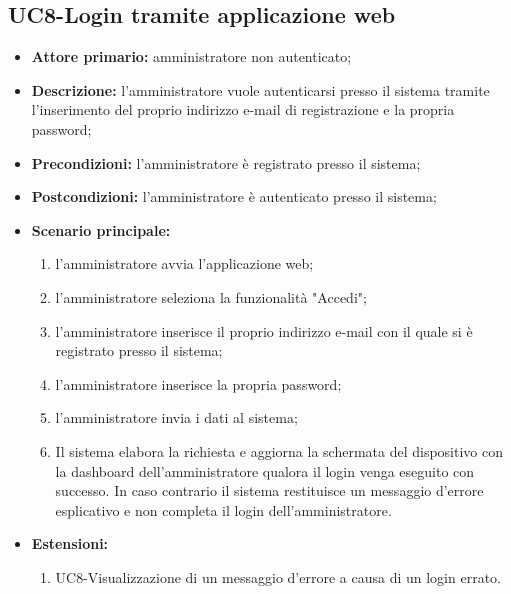 \subsection{UC8-Login tramite applicazione web}
\begin{itemize}
	\item \textbf{Attore primario:} amministratore non autenticato;

	\item \textbf{Descrizione:} l'amministratore vuole autenticarsi presso il sistema tramite l'inserimento del proprio indirizzo e-mail di registrazione e la propria password;

	\item \textbf{Precondizioni:} l'amministratore è registrato presso il sistema;

	\item \textbf{Postcondizioni:} l'amministratore è autenticato presso il sistema;

	\item \textbf{Scenario principale:} 

	\begin{enumerate}
   		 \item l'amministratore avvia l'applicazione web;
    	 \item l'amministratore seleziona la funzionalità "Accedi";
   		 \item l'amministratore inserisce il proprio indirizzo e-mail con il quale si è registrato presso il sistema;
    	 \item l'amministratore inserisce la propria password;
    	 \item l'amministratore invia i dati al sistema;
   		 \item Il sistema elabora la richiesta e aggiorna la schermata del dispositivo con la dashboard dell'amministratore qualora il login venga eseguito con successo. In caso contrario il sistema restituisce un messaggio d'errore esplicativo e non completa il login dell'amministratore.
	\end{enumerate}
	\item \textbf{Estensioni:}
	\begin{enumerate}
    	\item UC8-Visualizzazione di un messaggio d'errore a causa di un login errato.
	\end{enumerate}
\end{itemize}
